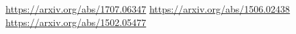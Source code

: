 \documentclass[a4paper]{article}
\begin{document}
%

\newpage
\begin{thebibliography}{9}
\url{https://arxiv.org/abs/1707.06347}
\url{https://arxiv.org/abs/1506.02438}
\url{https://arxiv.org/abs/1502.05477}
\end{thebibliography}
\end{document}
